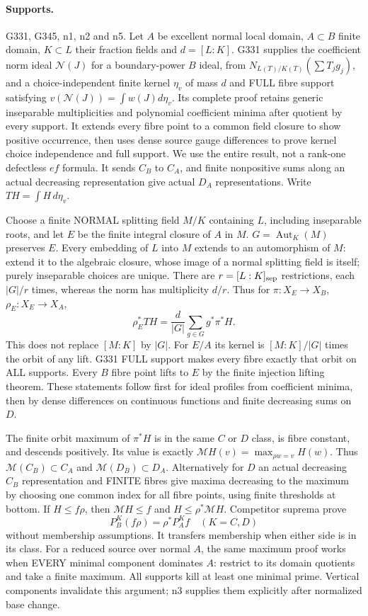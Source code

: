 \documentclass[11pt]{article}
\begin{document}
\paragraph{Supports.} G331, G345, n1, n2 and n5.
Let $A$ be excellent normal local domain, $A\subset B$ finite domain, $K\subset L$ their fraction fields and $d=[L:K]$. G331 supplies the coefficient norm ideal $\mathcal N(J)$ for a boundary-power $B$ ideal, from $N_{L(T)/K(T)}(\sum T_jg_j)$, and a choice-independent finite kernel $\eta_v$ of mass $d$ and FULL fibre support satisfying
$v(\mathcal N(J))=\int w(J)d\eta_v$. Its complete proof retains generic inseparable multiplicities and polynomial coefficient minima after quotient by every support. It extends every fibre point to a common field closure to show positive occurrence, then uses dense source gauge differences to prove kernel choice independence and full support. We use the entire result, not a rank-one defectless $ef$ formula. It sends $C_B$ to $C_A$, and finite nonpositive sums along an actual decreasing representation give actual $D_A$ representations. Write $TH=\int H\,d\eta_v$.

Choose a finite NORMAL splitting field $M/K$ containing $L$, including inseparable roots, and let $E$ be the finite integral closure of $A$ in $M$. $G=\operatorname{Aut}_K(M)$ preserves $E$. Every embedding of $L$ into $M$ extends to an automorphism of $M$: extend it to the algebraic closure, whose image of a normal splitting field is itself; purely inseparable choices are unique. There are $r=[L:K]_{\rm sep}$ restrictions, each $|G|/r$ times, whereas the norm has multiplicity $d/r$. Thus for $\pi:X_E\to X_B$, $\rho_E:X_E\to X_A$,
\[
 \rho_E^*TH=\frac d{|G|}\sum_{g\in G}g^*\pi^*H. \tag{11}
\]
This does not replace $[M:K]$ by $|G|$. For $E/A$ its kernel is $[M:K]/|G|$ times the orbit of any lift. G331 FULL support makes every fibre exactly that orbit on ALL supports. Every $B$ fibre point lifts to $E$ by the finite injection lifting theorem. These statements follow first for ideal profiles from coefficient minima, then by dense differences on continuous functions and finite decreasing sums on $D$.

The finite orbit maximum of $\pi^*H$ is in the same $C$ or $D$ class, is fibre constant, and descends positively. Its value is exactly $\mathcal MH(v)=\max_{\rho w=v}H(w)$. Thus $\mathcal M(C_B)\subset C_A$ and $\mathcal M(D_B)\subset D_A$. Alternatively for $D$ an actual decreasing $C_B$ representation and FINITE fibres give maxima decreasing to the maximum by choosing one common index for all fibre points, using finite thresholds at bottom. If $H\le f\rho$, then $\mathcal MH\le f$ and $H\le\rho^*\mathcal MH$. Competitor suprema prove
\[
 P_B^K(f\rho)=\rho^*P_A^Kf\quad(K=C,D) \tag{12}
\]
without membership assumptions. It transfers membership when either side is in its class. For a reduced source over normal $A$, the same maximum proof works when EVERY minimal component dominates $A$: restrict to its domain quotients and take a finite maximum. All supports kill at least one minimal prime. Vertical components invalidate this argument; n3 supplies them explicitly after normalized base change.
\end{document}
